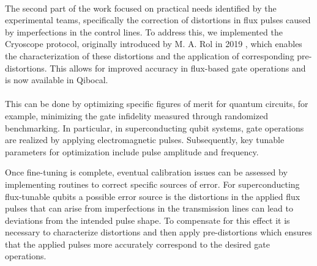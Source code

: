 \paragraph{}
The second part of the work focused on practical needs identified by the experimental teams, specifically the correction of distortions in flux pulses caused by imperfections in the control lines. 
To address this, we implemented the Cryoscope protocol, originally introduced by M. A. Rol in 2019 \cite{rol_time-domain_2020}, which enables the characterization of these distortions and the application of corresponding pre-distortions. This allows for improved accuracy in flux-based gate operations and is now available in Qibocal.

\paragraph{}

This can be done by optimizing specific figures of merit for quantum circuits, for example, minimizing the gate infidelity measured through randomized benchmarking. 
In particular, in superconducting qubit systems, gate operations are realized by applying electromagnetic pulses. Subsequently, key tunable parameters for optimization include pulse amplitude and frequency. 

Once fine-tuning is complete, eventual calibration issues can be assessed by implementing routines to correct specific sources of error. For superconducting flux-tunable qubits a possible error source is the distortions in the applied flux pulses that can arise from imperfections in the transmission lines can lead to deviations from the intended pulse shape. To compensate for this effect it is necessary to characterize distortions and then apply pre-distortions which ensures that the applied pulses more accurately correspond to the desired gate operations.
